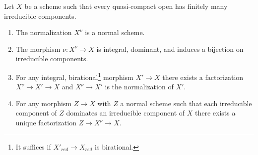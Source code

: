 \begin{lemma}
\label{lemma-normalization-normal}
Let $X$ be a scheme such that every quasi-compact open has
finitely many irreducible components.
\begin{enumerate}
\item The normalization $X^\nu$ is a normal scheme.
\item The morphism $\nu : X^\nu \to X$ is integral, dominant, and
induces a bijection on irreducible components.
\item For any integral, birational\footnote{It suffices if
$X'_{red} \to X_{red}$ is birational.} morphism $X' \to X$ there
exists a factorization $X^\nu \to X' \to X$ and $X^\nu \to X'$
is the normalization of $X'$.
\item For any morphism $Z \to X$ with $Z$ a normal scheme
such that each irreducible component of $Z$ dominates an irreducible
component of $X$ there exists a unique factorization $Z \to X^\nu \to X$.
\end{enumerate}
\end{lemma}

